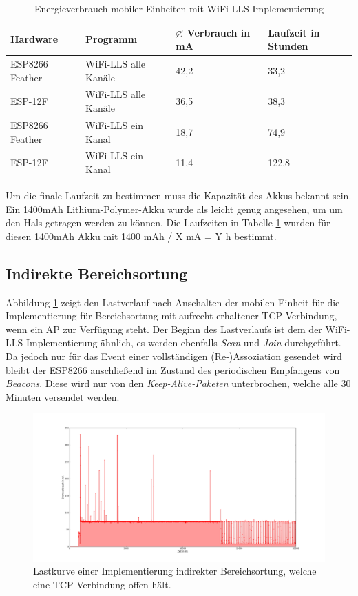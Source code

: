 \begin{table}[h!]
	\centering
	\caption{Energieverbrauch mobiler Einheiten mit WiFi-LLS Implementierung}
	\label{table:wifillsina}
	\begin{tabular}{p{3.5cm}|p{5cm}|p{2.5cm}|p{2.5cm}}
		Hardware & Programm & $\varnothing$ Verbrauch in mA & Laufzeit in Stunden\\
		\hline
		ESP8266 Feather & WiFi-LLS alle Kanäle & 42,2 & 33,2\\
		ESP-12F & WiFi-LLS alle Kanäle & 36,5 & 38,3\\
		ESP8266 Feather & WiFi-LLS ein Kanal & 18,7 & 74,9\\
		ESP-12F & WiFi-LLS ein Kanal & 11,4 & 122,8\\
	\end{tabular}
\end{table}

Um die finale Laufzeit zu bestimmen muss die Kapazität des Akkus bekannt sein.
Ein 1400mAh Lithium-Polymer-Akku wurde als leicht genug angesehen, um um den Hals getragen werden zu können.
Die Laufzeiten in Tabelle \ref{table:wifillsina} wurden für diesen 1400mAh Akku mit 1400 mAh / X mA = Y h bestimmt.



\subsection{Indirekte Bereichsortung}
\label{ch:phase1:sec:powerindirekt}
Abbildung \ref{fig:tcphold} zeigt den Lastverlauf nach Anschalten der mobilen Einheit für die Implementierung für Bereichsortung mit aufrecht erhaltener TCP-Verbindung, wenn ein AP zur Verfügung steht. 
Der Beginn des Lastverlaufs ist dem der WiFi-LLS-Implementierung ähnlich, es werden ebenfalls \emph{Scan} und \emph{Join} durchgeführt.
Da jedoch nur für das Event einer vollständigen (Re-)Assoziation gesendet wird bleibt der ESP8266 anschließend im Zustand des periodischen Empfangens von \emph{Beacons}.
Diese wird nur von den \emph{Keep-Alive-Paketen} unterbrochen, welche alle 30 Minuten versendet werden.\\

\begin{figure}[h!]
  \centering
	\includegraphics[width=\textwidth]{plots/tcphold.png}
  \caption{Lastkurve einer Implementierung indirekter Bereichsortung, welche eine TCP Verbindung offen hält.}
  \label{fig:tcphold}
\end{figure}

